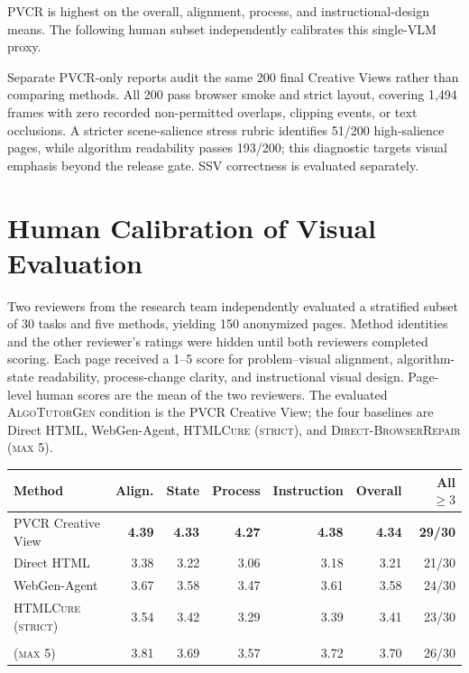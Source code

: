 \documentclass[letterpaper]{article}
\newcommand{\system}{\textsc{AlgoTutorGen}}
\newcommand{\ssv}{\textsc{SSV}}
\newcommand{\pvcr}{\textsc{PVCR}}
\newcommand{\dbr}{\textsc{Direct-BrowserRepair (max 5)}}
\newcommand{\htmlcure}{\textsc{HTMLCure (strict)}}
\newenvironment{coltable}
  {\begin{center}\begin{minipage}{\columnwidth}\centering}
  {\end{minipage}\end{center}}
\begin{document}
\pvcr{} is highest on the overall, alignment, process, and instructional-design means. The following human subset independently calibrates this single-VLM proxy.

Separate \pvcr{}-only reports audit the same 200 final Creative Views rather than comparing methods. All 200 pass browser smoke and strict layout, covering 1,494 frames with zero recorded non-permitted overlaps, clipping events, or text occlusions. A stricter scene-salience stress rubric identifies 51/200 high-salience pages, while algorithm readability passes 193/200; this diagnostic targets visual emphasis beyond the release gate. \ssv{} correctness is evaluated separately.

\section{Human Calibration of Visual Evaluation}
\label{sec:human_visual_calibration}

Two reviewers from the research team independently evaluated a stratified subset of 30 tasks and five methods, yielding 150 anonymized pages. Method identities and the other reviewer's ratings were hidden until both reviewers completed scoring. Each page received a 1--5 score for problem--visual alignment, algorithm-state readability, process-change clarity, and instructional visual design. Page-level human scores are the mean of the two reviewers. The evaluated \system{} condition is the \pvcr{} Creative View; the four baselines are Direct HTML, WebGen-Agent, \htmlcure{}, and \dbr{}.

\begin{coltable}
\scriptsize
\setlength{\tabcolsep}{2pt}
\begin{tabular}{@{}lrrrrrr@{}}
\toprule
Method & Align. & State & Process & Instruction & Overall & All $\geq3$ \\
\midrule
\pvcr{} Creative View & \textbf{4.39} & \textbf{4.33} & \textbf{4.27} & \textbf{4.38} & \textbf{4.34} & \textbf{29/30} \\
Direct HTML & 3.38 & 3.22 & 3.06 & 3.18 & 3.21 & 21/30 \\
WebGen-Agent & 3.67 & 3.58 & 3.47 & 3.61 & 3.58 & 24/30 \\
\htmlcure{} & 3.54 & 3.42 & 3.29 & 3.39 & 3.41 & 23/30 \\
\shortstack[l]{\textsc{Direct-BrowserRepair}\\\textsc{(max 5)}} & 3.81 & 3.69 & 3.57 & 3.72 & 3.70 & 26/30 \\
\bottomrule
\end{tabular}
\label{tab:human-visual-means}
\end{coltable}
\end{document}
